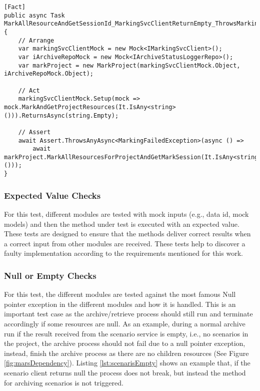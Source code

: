 \newpage
\begin{lstlisting}[language={[Sharp]C}, caption={Exception catch test example}, captionpos=b,label={lst:exceptionCatch}]
[Fact]
public async Task MarkAllResourceAndGetSessionId_MarkingSvcClientReturnEmpty_ThrowsMarkingFailedException()
{
    // Arrange
    var markingSvcClientMock = new Mock<IMarkingSvcClient>();
    var iArchiveRepoMock = new Mock<IArchiveStatusLoggerRepo>();
    var markProject = new MarkProject(markingSvcClientMock.Object, iArchiveRepoMock.Object);
    
    // Act 
    markingSvcClientMock.Setup(mock => mock.MarkAndGetProjectResources(It.IsAny<string>())).ReturnsAsync(string.Empty);
    
    // Assert
    await Assert.ThrowsAnyAsync<MarkingFailedException>(async () =>
        await markProject.MarkAllResourcesForProjectAndGetMarkSession(It.IsAny<string>()));
}
\end{lstlisting}

\subsubsection{Expected Value Checks}
For this test, different modules are tested with mock inputs (e.g., data id, mock models) and then the method under test is executed with an 
expected value. These tests are designed to ensure that the methods deliver correct results when a correct input from other modules are received.
These tests help to discover a faulty implementation according to the requirements mentioned for this work.

\subsubsection{Null or Empty Checks}
For this test, the different modules are tested against the most famous Null pointer exception in the different modules and how it is handled. This is an important
test case as the archive/retrieve process should still run and terminate accordingly if some resources are null. As an example, during a normal archive run if the result received from
the scenario service is empty, i.e., no scenarios in the project, the archive process should not fail due to a null pointer exception, instead, finish the archive process
as there are no children resources (See Figure \ref{fig:marsDependency}). Listing \ref{lst:scenarisEmpty} shows an example that, if the scenario client returns null 
the process does not break, but instead the method for archiving scenarios is not triggered. 

